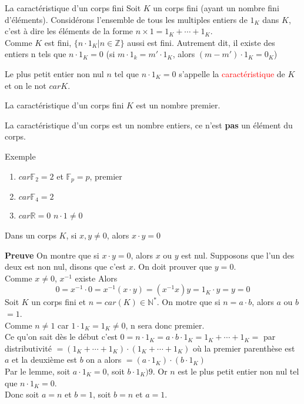 \begin{parag}{La caractéristique d'un corps fini}
    Soit $K$ un corps fini (ayant un nombre fini d'éléments). Considérons l'ensemble de tous les multiples entiers de $1_K$ dans $K$, c'est à dire les éléments de la forme $n \times 1 = 1_K + \cdots + 1_K$.\\
    Comme $K$ est fini, $\{n\cdot 1_K| n \in \mathbb{Z}\}$ aussi est fini. Autrement dit, il existe des entiers n tels que $n \cdot 1_K = 0$ (si $m \cdot 1_k = m'\cdot 1_K$, alors $(m-m')\cdot 1_K = 0_K$)
    \begin{definition}
        Le plus petit entier non nul $n$ tel que $n\cdot 1_K = 0$ s'appelle la \textcolor{red}{caractéristique} de $K$ et on le not $carK$.
    \end{definition}
    \begin{theoreme}
        La caractéristique d'un corps fini $K$ est un nombre premier.
    \end{theoreme}
    \begin{framedremark}
        La caractéristique d'un corps est un nombre entiers, ce n'est \textbf{pas} un élément du corps.
    \end{framedremark}
    \begin{subparag}{Exemple}
        \begin{enumerate}
            \item $car\mathbb{F}_2 = 2$ et $\mathbb{F}_p = p$, premier
            \item $car\mathbb{F}_4 = 2$
            \item $car\mathbb{R} = 0$ $n\cdot1 \neq 0$
        \end{enumerate}
        \begin{lemme}
            Dans un corps $K$, si $x, y \neq 0$, alors $x\cdot y = 0$
        \end{lemme}
        \textbf{Preuve} On montre que si $x\cdot y = 0$, alors $x$ ou $y$ est nul. Supposons que l'un des deux est non nul, disons que c'est $x$. On doit prouver que $y = 0$.\\
        Comme $x \neq 0$, $x^{-1}$ existe Alors
        \[0 = x^{-1}\cdot 0 = x^{-1}(x\cdot y) = (x^{-1}x)y = 1_K\cdot y = y = 0\]
        Soit $K$ un corps fini et $n = car(K) \in \mathbb{N}^*$. On motre que si $n = a\cdot b$, alors $a$ ou $b$ $= 1$.
        \\
        Comme $n \neq 1$ car $1\cdot 1_K = 1_K \neq 0$, n sera donc premier.
        \\
        Ce qu'on sait dès le début c'est $0 = n\cdot 1_K = a\cdot b \cdot 1_K = 1_K + \cdots + 1_K = $ par distributivité $ = (1_K + \cdots + 1_K)\cdot (1_K + \cdots + 1_K)$ où la premier parenthèse est $a$ et la deuxième est $b$ on a alors $= (a\cdot 1_K)\cdot (b\cdot 1_K)$
        \\
        Par le lemme, soit $a\cdot 1_K = 0$, soit $b\cdot 1_K ) 9$. Or $n$ est le plus petit entier non nul tel que $n \cdot 1_K = 0$.
        \\
        Donc soit $a = n$ et $b = 1$, soit $b = n$ et $a = 1$.
    \end{subparag}
\end{parag}
